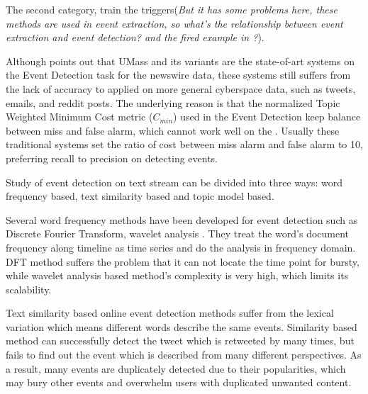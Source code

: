 \documentclass[conference,compsoc]{IEEEtran}
\begin{document}
The second category, train the triggers\cite{Li2013JointEE}\cite{Nguyen2015EventDA}(\textit{But it has some problems here, these methods are used in event extraction, so what's the relationship between event extraction and event detection? and the fired example in \cite{Li2013JointEE}?}). 


Although \cite{Wurzer:2015wq} points out that UMass\cite{Allan:2000wu} and its variants\cite{Petrovic:2010uj}\cite{petrovic2012using}\cite{Wurzer:2015wq} are the state-of-art systems on the Event Detection task for the newswire data, these systems still suffers from the lack of accuracy to applied on more general cyberspace data, such as tweets, emails, and reddit posts. 
The underlying reason is that the normalized Topic Weighted Minimum Cost metric (\(C_{min}\)) used in the Event Detection keep balance between miss and false alarm, which cannot work well on the .
Usually these traditional systems set the ratio of cost between miss alarm and false alarm to 10, preferring recall to precision on detecting events.

Study of event detection on text stream can be divided into three ways: word frequency based, text similarity based and topic model based.

Several word frequency methods have been developed for event detection such as Discrete Fourier Transform\cite{he2007analyzingDFT}, wavelet analysis \cite{weng2011eventWavelet}.
They treat the word's document frequency along timeline as time series and do the analysis in frequency domain. 
DFT method suffers the problem that it can not locate the time point for bursty, while wavelet analysis based method's complexity is very high, which limits its scalability. 

 Text similarity based online event detection methods\cite{petrovic2010streaming}\cite{mccreadie2013scalable}  suffer from the lexical variation which means different words describe the same events.
 Similarity based method can successfully detect the tweet which is retweeted by many times, but fails to find out the event which is described from many different perspectives.
 As a result, many events are duplicately detected due to their popularities, which may bury other events and overwhelm users with duplicated unwanted content.
\end{document}
